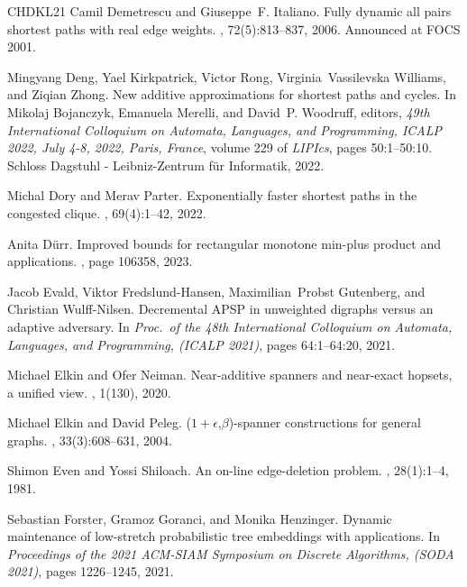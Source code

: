 \documentclass[11pt]{article}
\theoremstyle{definition}
\theoremstyle{remark}
\begin{document}
\begin{titlepage}
\begin{thebibliography}{CHDKL21}
Camil Demetrescu and Giuseppe~F. Italiano.
\newblock Fully dynamic all pairs shortest paths with real edge weights.
, 72(5):813--837, 2006.
\newblock Announced at {FOCS} 2001.

Mingyang Deng, Yael Kirkpatrick, Victor Rong, Virginia~Vassilevska Williams,
  and Ziqian Zhong.
\newblock New additive approximations for shortest paths and cycles.
\newblock In Mikolaj Bojanczyk, Emanuela Merelli, and David~P. Woodruff,
  editors, {\em 49th International Colloquium on Automata, Languages, and
  Programming, {ICALP} 2022, July 4-8, 2022, Paris, France}, volume 229 of {\em
  LIPIcs}, pages 50:1--50:10. Schloss Dagstuhl - Leibniz-Zentrum f{\"{u}}r
  Informatik, 2022.

Michal Dory and Merav Parter.
\newblock Exponentially faster shortest paths in the congested clique.
, 69(4):1--42, 2022.

Anita D{\"u}rr.
\newblock Improved bounds for rectangular monotone min-plus product and
  applications.
, page 106358, 2023.

Jacob Evald, Viktor Fredslund{-}Hansen, Maximilian~Probst Gutenberg, and
  Christian Wulff{-}Nilsen.
\newblock Decremental {APSP} in unweighted digraphs versus an adaptive
  adversary.
\newblock In {\em Proc.\ of the 48th International Colloquium on Automata,
  Languages, and Programming, ({ICALP} 2021)}, pages 64:1--64:20, 2021.

Michael Elkin and Ofer Neiman.
\newblock Near-additive spanners and near-exact hopsets, a unified view.
, 1(130), 2020.

Michael Elkin and David Peleg.
\newblock ($1+\epsilon$,$\beta$)-spanner constructions for general graphs.
, 33(3):608--631, 2004.

Shimon Even and Yossi Shiloach.
\newblock An on-line edge-deletion problem.
, 28(1):1--4, 1981.

Sebastian Forster, Gramoz Goranci, and Monika Henzinger.
\newblock Dynamic maintenance of low-stretch probabilistic tree embeddings with
  applications.
\newblock In {\em Proceedings of the 2021 {ACM-SIAM} Symposium on Discrete
  Algorithms, ({SODA} 2021)}, pages 1226--1245, 2021.


\end{thebibliography}
\end{titlepage}
\end{document}
